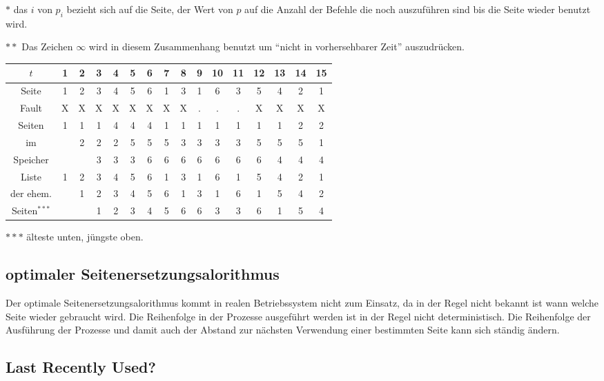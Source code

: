 \documentclass[ngerman]{fbi-aufgabenblatt}
\begin{document}
 $*$ das $i$ von $p_i$ bezieht sich auf die Seite, der Wert von $p$ auf die Anzahl der Befehle die noch
 auszuführen sind bis die Seite wieder benutzt wird.
 
 $**$ Das Zeichen $\infty$ wird in diesem Zusammenhang benutzt um ``nicht in vorhersehbarer Zeit'' auszudrücken.

 \begin{tabular}{c||c|c|c|c|c|c|c|c|c|c|c|c|c|c|c}
 $t$ 		& 1 & 2 & 3 & 4 & 5 & 6 & 7 & 8 & 9 & 10 & 11 & 12 & 13 & 14 & 15 \\\hline 
 Seite 		& 1 & 2 & 3 & 4 & 5 & 6 & 1 & 3 & 1 &  6 &  3 &  5 &  4 &  2 &  1 \\\hline 
 Fault		& X & X & X & X & X & X & X & X & . &  . &  . &  X &  X &  X &  X \\\hline 
 Seiten		& 1 & 1 & 1 & 4 & 4 & 4 & 1 & 1 & 1 &  1 &  1 &  1 &  1 &  2 &  2 \\
 im		&   & 2 & 2 & 2 & 5 & 5 & 5 & 3 & 3 &  3 &  3 &  5 &  5 &  5 &  1 \\
 Speicher	&   &   & 3 & 3 & 3 & 6 & 6 & 6 & 6 &  6 &  6 &  6 &  4 &  4 &  4 \\\hline
 Liste		& 1 & 2 & 3 & 4 & 5 & 6 & 1 & 3 & 1 &  6 &  1 &  5 &  4 &  2 &  1 \\
 der ehem.	&   & 1 & 2 & 3 & 4 & 5 & 6 & 1 & 3 &  1 &  6 &  1 &  5 &  4 &  2 \\
 Seiten$^{***}$	&   &   & 1 & 2 & 3 & 4 & 5 & 6 & 6 &  3 &  3 &  6 &  1 &  5 &  4 \\
 \end{tabular}
 
 $***$ älteste unten, jüngste oben.

 \subsection{optimaler Seitenersetzungsalorithmus}
 
 Der optimale Seitenersetzungsalorithmus kommt in realen Betriebssystem nicht zum Einsatz,
 da in der Regel nicht bekannt ist wann welche Seite wieder gebraucht wird. Die Reihenfolge in der Prozesse
 ausgeführt werden ist in der Regel nicht deterministisch. Die Reihenfolge der Ausführung der Prozesse und
 damit auch der Abstand zur nächsten Verwendung einer bestimmten Seite kann sich ständig ändern.

 \subsection{Last Recently Used?}
 
\end{document}
